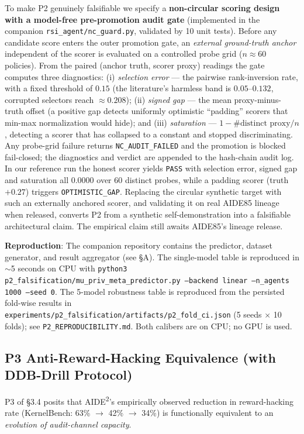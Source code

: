 To make P2 genuinely falsifiable we specify a \textbf{non-circular scoring design with a model-free pre-promotion audit gate} (implemented in the companion \texttt{rsi\_agent/nc\_guard.py}, validated by 10 unit tests). Before any candidate score enters the outer promotion gate, an \emph{external ground-truth anchor} independent of the scorer is evaluated on a controlled probe grid ($n\approx 60$ policies). From the paired (anchor truth, scorer proxy) readings the gate computes three diagnostics: (i) \emph{selection error} — the pairwise rank-inversion rate, with a fixed threshold of $0.15$ (the literature's harmless band is $0.05$--$0.132$, corrupted selectors reach $\approx0.208$); (ii) \emph{signed gap} — the mean proxy-minus-truth offset (a positive gap detects uniformly optimistic ``padding'' scorers that min-max normalization would hide); and (iii) \emph{saturation} — $1-\#\text{distinct proxy}/n$, detecting a scorer that has collapsed to a constant and stopped discriminating. Any probe-grid failure returns \texttt{NC\_AUDIT\_FAILED} and the promotion is blocked fail-closed; the diagnostics and verdict are appended to the hash-chain audit log. In our reference run the honest scorer yields \texttt{PASS} with selection error, signed gap and saturation all $0.0000$ over 60 distinct probes, while a padding scorer (truth $+0.27$) triggers \texttt{OPTIMISTIC\_GAP}. Replacing the circular synthetic target with such an externally anchored scorer, and validating it on real AIDE85 lineage when released, converts P2 from a synthetic self-demonstration into a falsifiable architectural claim. The empirical claim still awaits AIDE85's lineage release.

\textbf{Reproduction}: The companion repository contains the predictor, dataset generator, and result aggregator (see \S A). The single-model table is reproduced in $\sim$5 seconds on CPU with \texttt{python3 p2\_falsification/mu\_priv\_meta\_predictor.py --backend linear --n\_agents 1000 --seed 0}. The 5-model robustness table is reproduced from the persisted fold-wise results in \texttt{experiments/p2\_falsification/artifacts/p2\_fold\_ci.json} (5 seeds $\times$ 10 folds); see \texttt{P2\_REPRODUCIBILITY.md}. Both calibers are on CPU; no GPU is used.

\subsection{P3 Anti-Reward-Hacking Equivalence (with DDB-Drill Protocol)}

P3 of \S3.4 posits that AIDE\textsuperscript{2}'s empirically observed reduction in reward-hacking rate (KernelBench: 63\% $\to$ 42\% $\to$ 34\%) is functionally equivalent to an \emph{evolution of audit-channel capacity}.

